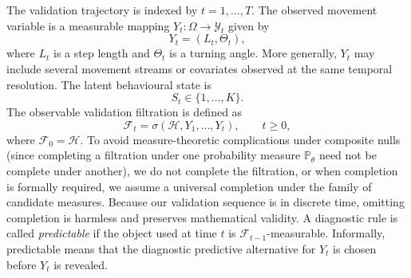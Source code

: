 \documentclass[pdflatex,sn-basic]{sn-jnl}
\theoremstyle{thmstyleone}
\theoremstyle{thmstyletwo}
\theoremstyle{thmstylethree}
\newcommand{\Pbb}{\mathbb P}
\newcommand{\1}{\mathbf 1}
\newcommand{\calF}{\mathcal F}
\newcommand{\calH}{\mathcal H}
\newcommand{\calY}{\mathcal Y}
\begin{document}
The validation trajectory is indexed by $t=1,\ldots,T$. The observed movement variable is a measurable mapping $Y_t:\Omega \to \calY_t$ given by
\begin{equation}
Y_t=(L_t,\Theta_t),
\end{equation}
where $L_t$ is a step length and $\Theta_t$ is a turning angle. More generally, $Y_t$ may include several movement streams or covariates observed at the same temporal resolution. The latent behavioural state is
\begin{equation}
S_t\in\{1,\ldots,K\}.
\end{equation}
The observable validation filtration is defined as
\begin{equation}
\calF_t=\sigma(\calH,Y_1,\ldots,Y_t),\qquad t\geq 0,
\end{equation}
where $\calF_0=\calH$. To avoid measure-theoretic complications under composite nulls (since completing a filtration under one probability measure $\Pbb_\theta$ need not be complete under another), we do not complete the filtration, or when completion is formally required, we assume a universal completion under the family of candidate measures. Because our validation sequence is in discrete time, omitting completion is harmless and preserves mathematical validity. A diagnostic rule is called \emph{predictable} if the object used at time $t$ is $\calF_{t-1}$-measurable. Informally, predictable means that the diagnostic predictive alternative for $Y_t$ is chosen before $Y_t$ is revealed.
\end{document}
